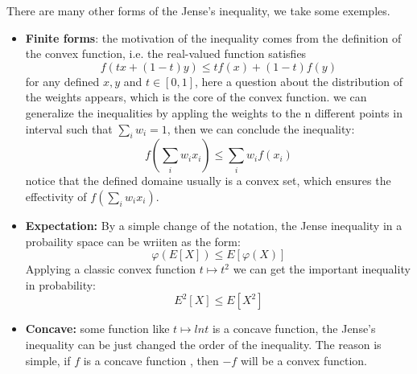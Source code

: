 \documentclass[en,geye,blue,pc,12pt]{elegantnote}
\begin{document}
\begin{remark}
    There are many other forms of the Jense's inequality, we take some exemples.
    \begin{itemize}
        \item \textbf{Finite forms}: the motivation of the inequality comes from the definition of the convex function, i.e. the real-valued function satisfies
        \[f(tx+(1-t)y) \leq tf(x) + (1-t)f(y)\]
        for any defined \(x,y\) and \(t \in [0,1]\), here a question about the distribution of the weights appears, which is the core of the convex function. we can generalize the inequalities by appling the weights to the n different points in interval such that \(\sum_i w_i =1\), then we can conclude the inequality:
        \[f(\sum_i w_i x_i) \leq \sum_i w_i f(x_i)\]
        notice that the defined domaine usually is a convex set, which ensures the effectivity of \(f(\sum_i w_i x_i)\). 

        \item \textbf{Expectation:} By a simple change of the notation, the Jense inequality in a probaility space can be wriiten as the form:
        \[\varphi(E[X]) \leq E[\varphi(X)]\]
        Applying a classic convex function \(t \mapsto t^2\) we can get the important inequality in probability:
        \[E^2[X] \leq E[X^2]\]
        \item \textbf{Concave:} some function like \(t \mapsto lnt\) is a concave function, the Jense's inequality can be just changed the order of the inequality. The reason is simple, if \(f\) is a concave function , then \(-f\) will be a convex function.
    \end{itemize}
\end{remark}
\end{document}

